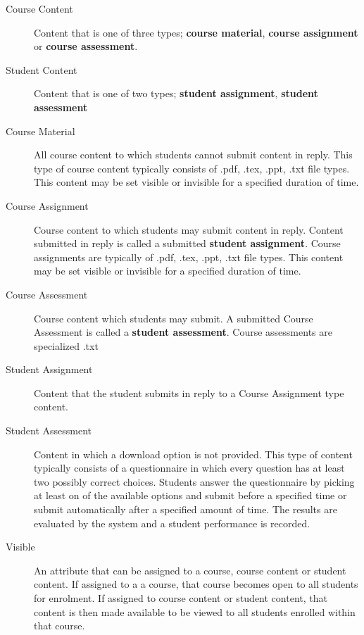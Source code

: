 \documentclass[]{article}
\begin{document}
\begin{description}
	\item [Course Content] Content that is one of three types; \textbf{course material}, \textbf{course assignment} or \textbf{course assessment}.

	\item [Student Content] Content that is one of two types; \textbf{student assignment}, \textbf{student assessment}

	\item [Course Material] All course content to which students cannot submit content in reply. This type of course content typically consists of .pdf, .tex, .ppt, .txt file types. This content may be set visible or invisible for a specified duration of time.

	\item [Course Assignment] Course content to which students may submit content in reply. Content submitted in reply is called a submitted \textbf{student assignment}. Course assignments are typically of .pdf, .tex, .ppt, .txt file types. This content may be set visible or invisible for a specified duration of time.

	\item [Course Assessment] Course content which students may submit. A submitted Course Assessment is called a \textbf{student assessment}. Course assessments are specialized .txt

	\item [Student Assignment] Content that the student submits in reply to a Course Assignment type content.

	\item [Student Assessment] Content in which a download option is not provided. This type of content typically consists of a questionnaire in which every question has at least two possibly correct choices. Students answer the questionnaire by picking at least on of the available options and submit before a specified time or submit automatically after a specified amount of time. The results are evaluated by the system and a student performance is recorded.

	\item [Visible] An attribute that can be assigned to a course, course content or student content. If assigned to a a course, that course becomes open to all students for enrolment. If assigned to course content or student content, that content is then made available to be viewed to all students enrolled within that course.

\end{description}
\end{document}
